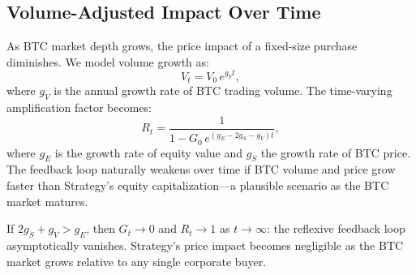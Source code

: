 \subsection{Volume-Adjusted Impact Over Time}

As BTC market depth grows, the price impact of a fixed-size purchase
diminishes. We model volume growth as:
\begin{equation}
  V_t = V_0\,e^{g_V t},
  \label{eq:volume_growth}
\end{equation}
where $g_V$ is the annual growth rate of BTC trading volume.
The time-varying amplification factor becomes:
\begin{equation}
  R_t = \frac{1}{1 - G_0\,e^{(g_E - 2g_S - g_V)t}},
  \label{eq:time_varying_R}
\end{equation}
where $g_E$ is the growth rate of equity value and $g_S$ the growth
rate of BTC price. The feedback loop naturally weakens over time
if BTC volume and price grow faster than Strategy's equity
capitalization---a plausible scenario as the BTC market matures.

\begin{corollary}
\label{cor:asymptotic}
If $2g_S + g_V > g_E$, then $G_t \to 0$ and $R_t \to 1$ as
$t \to \infty$: the reflexive feedback loop asymptotically vanishes.
Strategy's price impact becomes negligible as the BTC market
grows relative to any single corporate buyer.
\end{corollary}